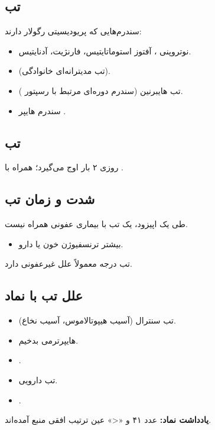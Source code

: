 \documentclass[12pt,a4paper]{article}
\begin{document}
\subsection*{تب }
سندرم‌هایی که پریودیسیتی رگولار دارند:
\begin{itemize}
\item نوتروپنی ، آفتوز استوماتایتیس، فارنژیت، آدنایتیس.
\item {} (تب مدیترانه‌ای خانوادگی).
\item تب هایبرنین (سندرم دوره‌ای مرتبط با رسپتور ).
\item سندرم هایپر .
\end{itemize}

\subsection*{تب }
روزی ۲ بار اوج می‌گیرد؛ همراه با .

\subsection*{شدت و زمان تب}
طی یک اپیزود، یک  تب با بیماری عفونی همراه نیست.
\begin{itemize}
\item بیشتر ترنسفیوژن خون یا دارو.
\end{itemize}

تب  درجه معمولاً علل غیرعفونی دارد.

\subsection*{علل تب با نماد }
\begin{itemize}
\item تب سنترال (آسیب هیپوتالاموس، آسیب نخاع).
\item هایپرترمی بدخیم.
\item {}.
\item تب دارویی.
\item {}.
\end{itemize}
\textbf{یادداشت نماد:} عدد ۴۱ و «<» عین ترتیب افقی منبع آمده‌اند.
\end{document}
